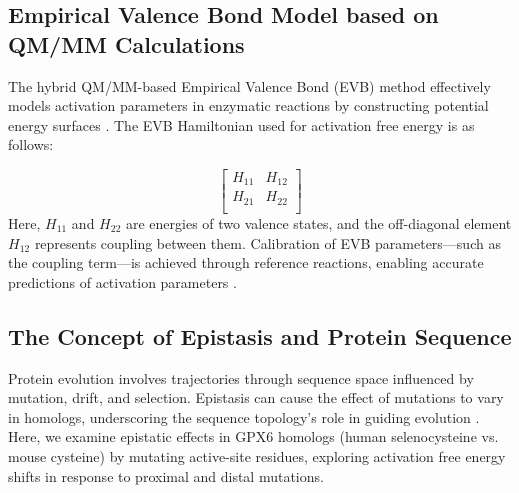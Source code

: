 \documentclass[journal=jacsat,manuscript=article]{achemso}
\begin{document}
\subsection{Empirical Valence Bond Model based on QM/MM Calculations}

The hybrid QM/MM-based Empirical Valence Bond (EVB) method effectively models activation parameters in enzymatic reactions by constructing potential energy surfaces \cite{Oanca2024}. The EVB Hamiltonian used for activation free energy is as follows:

\[ 
  \left[ {\begin{array}{cc}
    H_{11} & H_{12} \\
    H_{21} & H_{22} \\
  \end{array} } \right]
\]
Here, $ H_{11} $ and $ H_{22} $ are energies of two valence states, and the off-diagonal element $H_{12}$ represents coupling between them. Calibration of EVB parameters—such as the coupling term—is achieved through reference reactions, enabling accurate predictions of activation parameters \cite{Oanca2023}.

\subsection{The Concept of Epistasis and Protein Sequence}

Protein evolution involves trajectories through sequence space influenced by mutation, drift, and selection. Epistasis can cause the effect of mutations to vary in homologs, underscoring the sequence topology’s role in guiding evolution \cite{Starr2016}. Here, we examine epistatic effects in GPX6 homologs (human selenocysteine vs. mouse cysteine) by mutating active-site residues, exploring activation free energy shifts in response to proximal and distal mutations.
\end{document}
